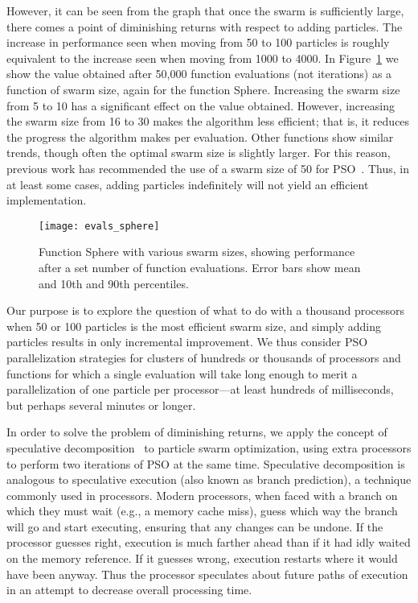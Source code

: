 \documentclass[smallcondensed]{svjour3}
\newcommand{\fig}[1]{Figure~\ref{fig:#1}}
\begin{document}
However, it can be seen from the graph that once the swarm is sufficiently
large, there comes a point of diminishing returns with respect to adding
particles.  The increase in performance seen when moving from 50 to 100
particles is roughly equivalent to the increase seen when moving from 1000 to
4000.  In \fig{evals-sphere} we show the value obtained after 50,000 function
evaluations (not iterations) as a function of swarm size, again for the
function Sphere.  Increasing the swarm size from 5 to 10 has a significant
effect on the value obtained.  However, increasing the swarm size from 16 to 30
makes the algorithm less efficient; that is, it reduces the progress the
algorithm makes per evaluation.  Other functions show similar trends, though
often the optimal swarm size is slightly larger.  For this reason, previous
work has recommended the use of a swarm size of 50 for
PSO~\citep{bratton-2007-defining-a-standard-for-pso}.  Thus, in at least some
cases, adding particles indefinitely will not yield an efficient
implementation.

\begin{figure}
  \centering
  \texttt{[image: evals\_sphere]}
  \caption{Function Sphere with various swarm sizes, showing performance after
  a set number of function evaluations.  Error bars show mean and 10th and 90th
  percentiles.}
  \label{fig:evals-sphere}
\end{figure}

Our purpose is to explore the question of what to do with a thousand processors
when 50 or 100 particles is the most efficient swarm size, and simply adding
particles results in only incremental improvement.  We thus consider PSO
parallelization strategies for clusters of hundreds or thousands of processors
and functions for which a single evaluation will take long enough to merit a
parallelization of one particle per processor---at least hundreds of
milliseconds, but perhaps several minutes or longer.

In order to solve the problem of diminishing returns, we apply the concept of
speculative decomposition~\citep{grama-2003-intro-to-parallel-computing} to
particle swarm optimization, using extra processors to perform two iterations
of PSO at the same time.  Speculative decomposition is analogous to speculative
execution (also known as branch prediction), a technique commonly used in
processors.  Modern processors, when faced with a branch on which they must
wait (e.g., a memory cache miss), guess which way the branch will go and start
executing, ensuring that any changes can be undone.  If the processor guesses
right, execution is much farther ahead than if it had idly waited on the memory
reference.  If it guesses wrong, execution restarts where it would have been
anyway.  Thus the processor speculates about future paths of execution in an
attempt to decrease overall processing time.
\end{document}
